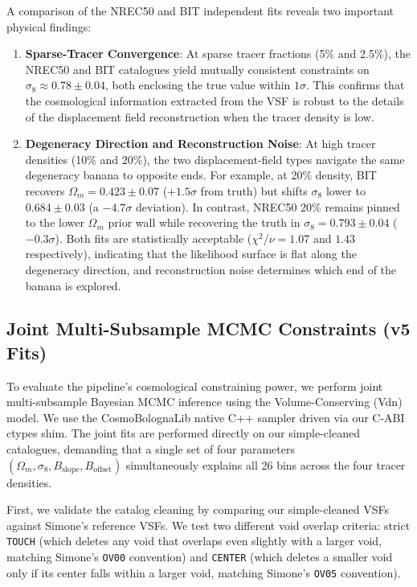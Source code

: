 \documentclass[12pt]{report}
\begin{document}
A comparison of the NREC50 and BIT independent fits reveals two important physical findings:
\begin{enumerate}
    \item \textbf{Sparse-Tracer Convergence}: At sparse tracer fractions (5\% and 2.5\%), the NREC50 and BIT catalogues yield mutually consistent constraints on $\sigma_8 \approx 0.78 \pm 0.04$, both enclosing the true value within $1\sigma$. This confirms that the cosmological information extracted from the VSF is robust to the details of the displacement field reconstruction when the tracer density is low.
    \item \textbf{Degeneracy Direction and Reconstruction Noise}: At high tracer densities (10\% and 20\%), the two displacement-field types navigate the same degeneracy banana to opposite ends. For example, at 20\% density, BIT recovers $\Omega_m = 0.423 \pm 0.07$ ($+1.5\sigma$ from truth) but shifts $\sigma_8$ lower to $0.684 \pm 0.03$ (a $-4.7\sigma$ deviation). In contrast, NREC50 20\% remains pinned to the lower $\Omega_m$ prior wall while recovering the truth in $\sigma_8 = 0.793 \pm 0.04$ ($-0.3\sigma$). Both fits are statistically acceptable ($\chi^2/\nu = 1.07$ and $1.43$ respectively), indicating that the likelihood surface is flat along the degeneracy direction, and reconstruction noise determines which end of the banana is explored.
\end{enumerate}

\subsection{Joint Multi-Subsample MCMC Constraints (v5 Fits)}
\label{sec:joint_mcmc}

To evaluate the pipeline's cosmological constraining power, we perform joint multi-subsample Bayesian MCMC inference using the Volume-Conserving (Vdn) model. We use the CosmoBolognaLib native C++ sampler driven via our C-ABI ctypes shim. The joint fits are performed directly on our simple-cleaned catalogues, demanding that a single set of four parameters $(\Omega_m, \sigma_8, B_{\mathrm{slope}}, B_{\mathrm{offset}})$ simultaneously explains all 26 bins across the four tracer densities. 

First, we validate the catalog cleaning by comparing our simple-cleaned VSFs against Simone's reference VSFs. We test two different void overlap criteria: strict \texttt{TOUCH} (which deletes any void that overlaps even slightly with a larger void, matching Simone's \texttt{OV00} convention) and \texttt{CENTER} (which deletes a smaller void only if its center falls within a larger void, matching Simone's \texttt{OV05} convention). 
\end{document}
